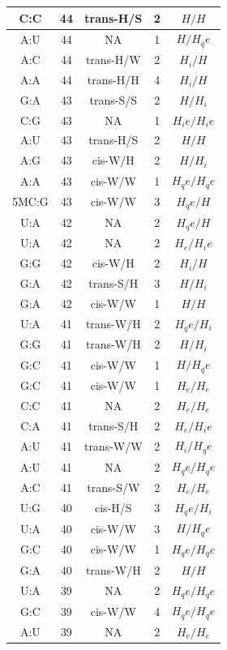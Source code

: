\begin{center}
\begin{longtable}{c|c|c|c|c}
C:C & 44 & trans-H/S & 2 & $H/H$ \\  \hline
A:U & 44 & NA & 1 & $H/H_qe$ \\  \hline
A:C & 44 & trans-H/W & 2 & $H_i/H$ \\  \hline
A:A & 44 & trans-H/H & 4 & $H_i/H$ \\  \hline
G:A & 43 & trans-S/S & 2 & $H/H_i$ \\  \hline
C:G & 43 & NA & 1 & $H_ie/H_ie$ \\  \hline
A:U & 43 & trans-H/S & 2 & $H/H$ \\  \hline
A:G & 43 & cis-W/H & 2 & $H/H_i$ \\  \hline
A:A & 43 & cis-W/W & 1 & $H_qe/H_qe$ \\  \hline
5MC:G & 43 & cis-W/W & 3 & $H_qe/H$ \\  \hline
U:A & 42 & NA & 2 & $H_qe/H$ \\  \hline
U:A & 42 & NA & 2 & $H_e/H_ie$ \\  \hline
G:G & 42 & cis-W/H & 2 & $H_i/H$ \\  \hline
G:A & 42 & trans-S/H & 3 & $H/H_i$ \\  \hline
G:A & 42 & cis-W/W & 1 & $H/H$ \\  \hline
U:A & 41 & trans-W/H & 2 & $H_qe/H_i$ \\  \hline
G:G & 41 & trans-W/H & 2 & $H/H_i$ \\  \hline
G:C & 41 & cis-W/W & 1 & $H/H_qe$ \\  \hline
G:C & 41 & cis-W/W & 1 & $H_e/H_e$ \\  \hline
C:C & 41 & NA & 2 & $H_e/H_e$ \\  \hline
C:A & 41 & trans-S/H & 2 & $H_e/H_ie$ \\  \hline
A:U & 41 & trans-W/W & 2 & $H_i/H_qe$ \\  \hline
A:U & 41 & NA & 2 & $H_qe/H_qe$ \\  \hline
A:C & 41 & trans-S/W & 2 & $H_e/H_e$ \\  \hline
U:G & 40 & cis-H/S & 3 & $H_qe/H_i$ \\  \hline
U:A & 40 & cis-W/W & 3 & $H/H_qe$ \\  \hline
G:C & 40 & cis-W/W & 1 & $H_qe/H_qe$ \\  \hline
G:A & 40 & trans-W/H & 2 & $H/H$ \\  \hline
U:A & 39 & NA & 2 & $H_qe/H_qe$ \\  \hline
G:C & 39 & cis-W/W & 4 & $H_qe/H_qe$ \\  \hline
A:U & 39 & NA & 2 & $H_e/H_e$ \\  \hline

\end{longtable}
\end{center}
